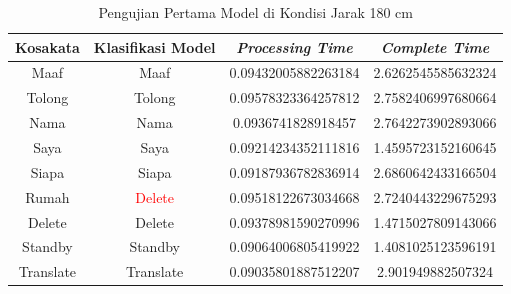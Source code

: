 \begin{longtable}{|c|c|c|c|}
  \caption{Pengujian Pertama Model di Kondisi Jarak 180 cm}
  \label{tb:prediksipendek1}                                   \\
  \hline
  \rowcolor[HTML]{C0C0C0}
  \textbf{Kosakata} & \textbf{Klasifikasi Model} & \textbf{\emph{Processing Time}} & \textbf{\emph{Complete Time}}\\
  \hline
  Maaf              & Maaf                        & 0.09432005882263184                           & 2.6262545585632324                                  \\
  Tolong            & Tolong                        & 0.09578323364257812                           & 2.7582406997680664                                  \\
  Nama              & Nama                        & 0.0936741828918457                           & 2.7642273902893066                                  \\
  Saya              & Saya                        & 0.09214234352111816                           & 1.4595723152160645                                  \\
  Siapa              & Siapa                        & 0.09187936782836914                           & 2.6860642433166504                                  \\
  Rumah             & \textcolor{red}{Delete}                        & 0.09518122673034668                           & 2.7240443229675293                                  \\
  Delete            & Delete                        & 0.09378981590270996                           & 1.4715027809143066                                  \\
  Standby           & Standby                        & 0.09064006805419922                           & 1.4081025123596191                                  \\
  Translate         & Translate                        & 0.09035801887512207                           & 2.901949882507324                                  \\
  \hline
\end{longtable}


